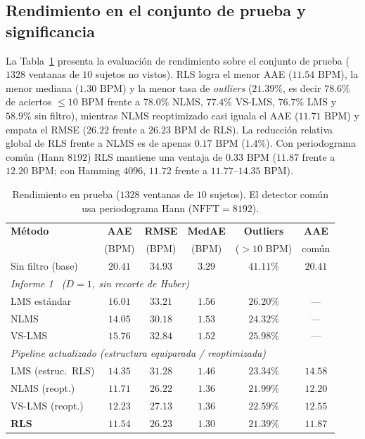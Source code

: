 \documentclass[conference]{IEEEtran}
\begin{document}
\subsection{Rendimiento en el conjunto de prueba y significancia}
\label{sec:res_test}

La Tabla~\ref{tab:test_results} presenta la evaluación de rendimiento sobre el conjunto de prueba ($1328$ ventanas de $10$ sujetos no vistos). RLS logra el menor AAE ($11.54\text{ BPM}$), la menor mediana ($1.30\text{ BPM}$) y la menor tasa de \textit{outliers} ($21.39\%$, es decir $78.6\%$ de aciertos $\le 10\text{ BPM}$ frente a $78.0\%$ NLMS, $77.4\%$ VS-LMS, $76.7\%$ LMS y $58.9\%$ sin filtro), mientras NLMS reoptimizado casi iguala el AAE ($11.71\text{ BPM}$) y empata el RMSE ($26.22$ frente a $26.23\text{ BPM}$ de RLS). La reducción relativa global de RLS frente a NLMS es de apenas $0.17\text{ BPM}$ ($1.4\%$). Con periodograma común (Hann $8192$) RLS mantiene una ventaja de $0.33\text{ BPM}$ ($11.87$ frente a $12.20\text{ BPM}$; con Hamming $4096$, $11.72$ frente a $11.77$--$14.35\text{ BPM}$).

\begin{table}[!t]
    \centering
    \caption{Rendimiento en prueba ($1328$ ventanas de $10$ sujetos). El detector común usa periodograma Hann ($\text{NFFT}=8192$).}
    \label{tab:test_results}
    \footnotesize
    \setlength{\tabcolsep}{1.8pt}
    \begin{tabular}{lccccc}
        \toprule
        \textbf{Método} & \textbf{AAE} & \textbf{RMSE} & \textbf{MedAE} & \textbf{Outliers} & \textbf{AAE} \\
         & (BPM) & (BPM) & (BPM) & ($>10$ BPM) & común \\
        \midrule
        Sin filtro (base) & $20.41$ & $34.93$ & $3.29$ & $41.11\%$ & $20.41$ \\
        \midrule
        \multicolumn{6}{l}{\textit{Informe 1~\cite{informe1} ($D=1$, sin recorte de Huber)}} \\
        LMS estándar & $16.01$ & $33.21$ & $1.56$ & $26.20\%$ & --- \\
        NLMS & $14.05$ & $30.18$ & $1.53$ & $24.32\%$ & --- \\
        VS-LMS & $15.76$ & $32.84$ & $1.52$ & $25.98\%$ & --- \\
        \midrule
        \multicolumn{6}{l}{\textit{Pipeline actualizado (estructura equiparada / reoptimizada)}} \\
        LMS (estruc.\ RLS) & $14.35$ & $31.28$ & $1.46$ & $23.34\%$ & $14.58$ \\
        NLMS (reopt.) & $11.71$ & $\mathbf{26.22}$ & $1.36$ & $21.99\%$ & $12.20$ \\
        VS-LMS (reopt.) & $12.23$ & $27.13$ & $1.36$ & $22.59\%$ & $12.55$ \\
        \textbf{RLS} & $\mathbf{11.54}$ & $26.23$ & $\mathbf{1.30}$ & $\mathbf{21.39\%}$ & $\mathbf{11.87}$ \\
        \bottomrule
    \end{tabular}
\end{table}
\end{document}
